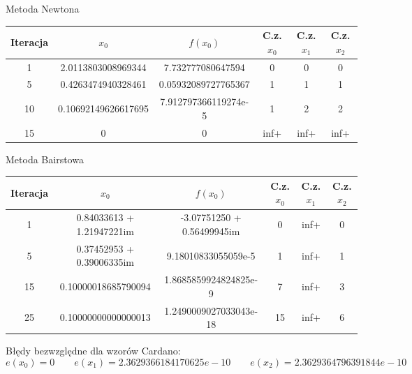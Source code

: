 \documentclass[a4paper]{article}
\begin{document}
    \begin{center}
        Metoda Newtona
    \end{center}
    \begin{center}
        \begin{tabular}{|c|c|c|c|c|c|} 
            \hline
            Iteracja & $x_0$ & $f(x_0)$ & C.z. $x_0$ & C.z. $x_1$ & C.z. $x_2$ \\
            \hline
            1 & 2.0113803008969344 & 7.732777080647594 & 0 & 0 & 0 \\
            \hline
            5 & 0.4263474940328461 & 0.05932089727765367 & 1 & 1 & 1 \\
            \hline
            10 & 0.10692149626617695 & 7.912797366119274e-5 & 1 & 2 & 2 \\
            \hline
            15 & 0 & 0 & inf+ & inf+ & inf+ \\
            \hline
        \end{tabular}
    \end{center}
        
    \vspace{5mm}

    \begin{center}
        Metoda Bairstowa
    \end{center}
    \begin{center}
        \begin{tabular}{|c|c|c|c|c|c|} 
            \hline
            Iteracja & $x_0$ & $f(x_0)$ & C.z. $x_0$ & C.z. $x_1$ & C.z. $x_2$ \\
            \hline
            1 & 0.84033613 + 1.21947221im & -3.07751250 + 0.56499945im & 0 & inf+ & 0 \\ 
            \hline
            5 & 0.37452953 + 0.39006335im & 9.18010833055059e-5 & 1 & inf+ & 1 \\ 
            \hline
            15 & 0.10000018685790094 & 1.8685859924824825e-9 & 7 & inf+ & 3 \\
            \hline
            25 & 0.10000000000000013 & 1.2490009027033043e-18 & 15 & inf+ & 6 \\
            \hline
        \end{tabular}
    \end{center}

    \vspace{5mm}

    \begin{center}
        Błędy bezwzględne dla wzorów Cardano:
        \[
            e(x_0) = 0 \qquad e(x_1) = 2.3629366184170625e-10 \qquad e(x_2) = 2.3629364796391844e-10  
        \]
    \end{center}
\end{document}
